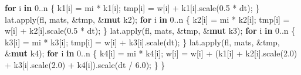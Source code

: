 \documentclass[
  10pt,
]{article}
\newenvironment{Shaded}{}{}
\newcommand{\ControlFlowTok}[1]{\textcolor[rgb]{0.00,0.44,0.13}{\textbf{#1}}}
\newcommand{\DecValTok}[1]{\textcolor[rgb]{0.25,0.63,0.44}{#1}}
\newcommand{\KeywordTok}[1]{\textcolor[rgb]{0.00,0.44,0.13}{\textbf{#1}}}
\newcommand{\NormalTok}[1]{#1}
\newcommand{\OperatorTok}[1]{\textcolor[rgb]{0.40,0.40,0.40}{#1}}
\begin{document}
\begin{Shaded}
\begin{Highlighting}[]
    \ControlFlowTok{for}\NormalTok{ i }\KeywordTok{in} \DecValTok{0}\OperatorTok{..}\NormalTok{n }\OperatorTok{\{}
\NormalTok{        k1[i] }\OperatorTok{=}\NormalTok{ mi }\OperatorTok{*}\NormalTok{ k1[i]}\OperatorTok{;}
\NormalTok{        tmp[i] }\OperatorTok{=}\NormalTok{ w[i] }\OperatorTok{+}\NormalTok{ k1[i]}\OperatorTok{.}\NormalTok{scale(}\DecValTok{0.5} \OperatorTok{*}\NormalTok{ dt)}\OperatorTok{;}
    \OperatorTok{\}}
\NormalTok{    lat}\OperatorTok{.}\NormalTok{apply(fl}\OperatorTok{,}\NormalTok{ mats}\OperatorTok{,} \OperatorTok{\&}\NormalTok{tmp}\OperatorTok{,} \OperatorTok{\&}\KeywordTok{mut}\NormalTok{ k2)}\OperatorTok{;}
    \ControlFlowTok{for}\NormalTok{ i }\KeywordTok{in} \DecValTok{0}\OperatorTok{..}\NormalTok{n }\OperatorTok{\{}
\NormalTok{        k2[i] }\OperatorTok{=}\NormalTok{ mi }\OperatorTok{*}\NormalTok{ k2[i]}\OperatorTok{;}
\NormalTok{        tmp[i] }\OperatorTok{=}\NormalTok{ w[i] }\OperatorTok{+}\NormalTok{ k2[i]}\OperatorTok{.}\NormalTok{scale(}\DecValTok{0.5} \OperatorTok{*}\NormalTok{ dt)}\OperatorTok{;}
    \OperatorTok{\}}
\NormalTok{    lat}\OperatorTok{.}\NormalTok{apply(fl}\OperatorTok{,}\NormalTok{ mats}\OperatorTok{,} \OperatorTok{\&}\NormalTok{tmp}\OperatorTok{,} \OperatorTok{\&}\KeywordTok{mut}\NormalTok{ k3)}\OperatorTok{;}
    \ControlFlowTok{for}\NormalTok{ i }\KeywordTok{in} \DecValTok{0}\OperatorTok{..}\NormalTok{n }\OperatorTok{\{}
\NormalTok{        k3[i] }\OperatorTok{=}\NormalTok{ mi }\OperatorTok{*}\NormalTok{ k3[i]}\OperatorTok{;}
\NormalTok{        tmp[i] }\OperatorTok{=}\NormalTok{ w[i] }\OperatorTok{+}\NormalTok{ k3[i]}\OperatorTok{.}\NormalTok{scale(dt)}\OperatorTok{;}
    \OperatorTok{\}}
\NormalTok{    lat}\OperatorTok{.}\NormalTok{apply(fl}\OperatorTok{,}\NormalTok{ mats}\OperatorTok{,} \OperatorTok{\&}\NormalTok{tmp}\OperatorTok{,} \OperatorTok{\&}\KeywordTok{mut}\NormalTok{ k4)}\OperatorTok{;}
    \ControlFlowTok{for}\NormalTok{ i }\KeywordTok{in} \DecValTok{0}\OperatorTok{..}\NormalTok{n }\OperatorTok{\{}
\NormalTok{        k4[i] }\OperatorTok{=}\NormalTok{ mi }\OperatorTok{*}\NormalTok{ k4[i]}\OperatorTok{;}
\NormalTok{        w[i] }\OperatorTok{=}\NormalTok{ w[i] }\OperatorTok{+}\NormalTok{ (k1[i] }\OperatorTok{+}\NormalTok{ k2[i]}\OperatorTok{.}\NormalTok{scale(}\DecValTok{2.0}\NormalTok{) }\OperatorTok{+}\NormalTok{ k3[i]}\OperatorTok{.}\NormalTok{scale(}\DecValTok{2.0}\NormalTok{) }\OperatorTok{+}\NormalTok{ k4[i])}\OperatorTok{.}\NormalTok{scale(dt }\OperatorTok{/} \DecValTok{6.0}\NormalTok{)}\OperatorTok{;}
    \OperatorTok{\}}
\OperatorTok{\}}


\end{Highlighting}
\end{Shaded}
\end{document}
